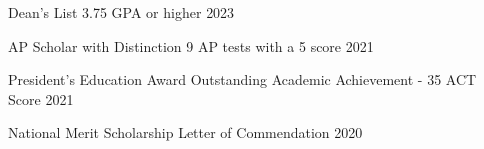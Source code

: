 




\begin{cvhonors}
\cvhonor
{Dean's List} %
{3.75 GPA or higher} %
{} %
{2023} %

\cvhonor
{AP Scholar with Distinction} %
{9 AP tests with a 5 score} %
{} %
{2021} %

\cvhonor
{President's Education Award} %
{Outstanding Academic Achievement - 35 ACT Score} %
{} %
{2021} %

\cvhonor
{National Merit Scholarship} %
{Letter of Commendation} %
{} %
{2020} %










\end{cvhonors}




